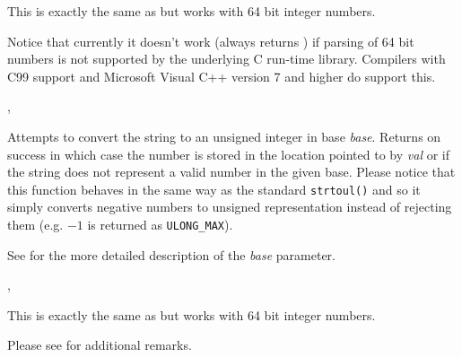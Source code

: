 \label{wxstringtolonglong}


This is exactly the same as  but works with 64
bit integer numbers.

Notice that currently it doesn't work (always returns \false) if parsing of 64
bit numbers is not supported by the underlying C run-time library. Compilers
with C99 support and Microsoft Visual C++ version 7 and higher do support this.


,\\


\label{wxstringtoulong}


Attempts to convert the string to an unsigned integer in base {\it base}.
Returns \true on success in which case the number is stored in the
location pointed to by {\it val} or \false if the string does not
represent a valid number in the given base. Please notice that this function
behaves in the same way as the standard \texttt{strtoul()} and so it simply
converts negative numbers to unsigned representation instead of rejecting them
(e.g. $-1$ is returned as \texttt{ULONG\_MAX}).

See  for the more detailed
description of the {\it base} parameter.


,\\


\label{wxstringtoulonglong}


This is exactly the same as  but works with 64
bit integer numbers.

Please see  for additional remarks.


\label{wxstringtoutf8}

